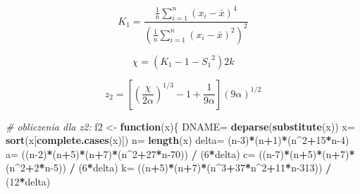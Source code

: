 \documentclass[polish,]{book}
\newenvironment{Shaded}{\begin{snugshade}}{\end{snugshade}}
\newcommand{\CommentTok}[1]{\textcolor[rgb]{0.56,0.35,0.01}{\textit{#1}}}
\newcommand{\ControlFlowTok}[1]{\textcolor[rgb]{0.13,0.29,0.53}{\textbf{#1}}}
\newcommand{\DecValTok}[1]{\textcolor[rgb]{0.00,0.00,0.81}{#1}}
\newcommand{\KeywordTok}[1]{\textcolor[rgb]{0.13,0.29,0.53}{\textbf{#1}}}
\newcommand{\NormalTok}[1]{#1}
\newcommand{\OperatorTok}[1]{\textcolor[rgb]{0.81,0.36,0.00}{\textbf{#1}}}
\newcommand{\StringTok}[1]{\textcolor[rgb]{0.31,0.60,0.02}{#1}}
\begin{document}
\begin{equation}
K_1=\frac{\frac{1}{n}\sum_{i=1}^{n}(x_i-\bar{x})^4}{\left(\frac{1}{n}\sum_{i=1}^{n}(x_i-\bar{x})^2\right)^2}
\label{eq:wz1113}
\end{equation}

\begin{equation}
\chi=(K_1-1-{S_1}^2)2k
\label{eq:wz1114}
\end{equation}

\begin{equation}
z_2=\left[\left(\frac{\chi}{2\alpha}\right)^{1/3}-1+\frac{1}{9\alpha}\right](9\alpha)^{1/2}
\label{eq:wz1115}
\end{equation}

\begin{Shaded}
\begin{Highlighting}[]
\CommentTok{# obliczenia dla z2:}
\NormalTok{f2 <-}\StringTok{ }\ControlFlowTok{function}\NormalTok{(x)\{}
\NormalTok{  DNAME=}\StringTok{ }\KeywordTok{deparse}\NormalTok{(}\KeywordTok{substitute}\NormalTok{(x))}
\NormalTok{  x=}\StringTok{ }\KeywordTok{sort}\NormalTok{(x[}\KeywordTok{complete.cases}\NormalTok{(x)])}
\NormalTok{  n=}\StringTok{ }\KeywordTok{length}\NormalTok{(x)}
\NormalTok{  delta=}\StringTok{ }\NormalTok{(n}\DecValTok{-3}\NormalTok{)}\OperatorTok{*}\NormalTok{(n}\OperatorTok{+}\DecValTok{1}\NormalTok{)}\OperatorTok{*}\NormalTok{(n}\OperatorTok{^}\DecValTok{2}\OperatorTok{+}\DecValTok{15}\OperatorTok{*}\NormalTok{n}\DecValTok{-4}\NormalTok{)}
\NormalTok{  a=}\StringTok{ }\NormalTok{((n}\DecValTok{-2}\NormalTok{)}\OperatorTok{*}\NormalTok{(n}\OperatorTok{+}\DecValTok{5}\NormalTok{)}\OperatorTok{*}\NormalTok{(n}\OperatorTok{+}\DecValTok{7}\NormalTok{)}\OperatorTok{*}\NormalTok{(n}\OperatorTok{^}\DecValTok{2}\OperatorTok{+}\DecValTok{27}\OperatorTok{*}\NormalTok{n}\DecValTok{-70}\NormalTok{)) }\OperatorTok{/}\StringTok{ }\NormalTok{(}\DecValTok{6}\OperatorTok{*}\NormalTok{delta)}
\NormalTok{  c=}\StringTok{ }\NormalTok{((n}\DecValTok{-7}\NormalTok{)}\OperatorTok{*}\NormalTok{(n}\OperatorTok{+}\DecValTok{5}\NormalTok{)}\OperatorTok{*}\NormalTok{(n}\OperatorTok{+}\DecValTok{7}\NormalTok{)}\OperatorTok{*}\NormalTok{(n}\OperatorTok{^}\DecValTok{2}\OperatorTok{+}\DecValTok{2}\OperatorTok{*}\NormalTok{n}\DecValTok{-5}\NormalTok{)) }\OperatorTok{/}\StringTok{ }\NormalTok{(}\DecValTok{6}\OperatorTok{*}\NormalTok{delta)}
\NormalTok{  k=}\StringTok{ }\NormalTok{((n}\OperatorTok{+}\DecValTok{5}\NormalTok{)}\OperatorTok{*}\NormalTok{(n}\OperatorTok{+}\DecValTok{7}\NormalTok{)}\OperatorTok{*}\NormalTok{(n}\OperatorTok{^}\DecValTok{3}\OperatorTok{+}\DecValTok{37}\OperatorTok{*}\NormalTok{n}\OperatorTok{^}\DecValTok{2}\OperatorTok{+}\DecValTok{11}\OperatorTok{*}\NormalTok{n}\DecValTok{-313}\NormalTok{)) }\OperatorTok{/}\StringTok{ }\NormalTok{(}\DecValTok{12}\OperatorTok{*}\NormalTok{delta)}

\end{Highlighting}
\end{Shaded}
\end{document}
